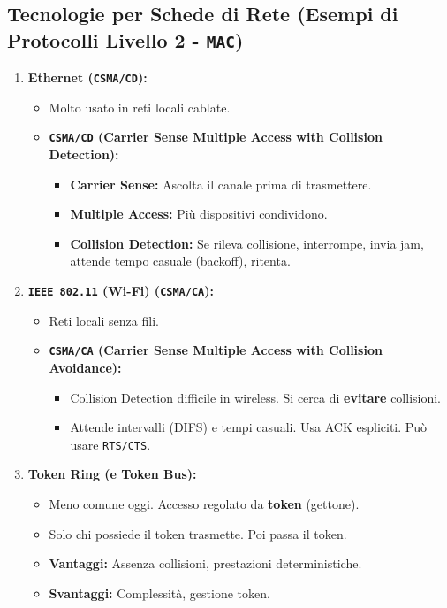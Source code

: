 \documentclass{article}
\begin{document}
\subsection{Tecnologie per Schede di Rete (Esempi di Protocolli Livello 2 - \texttt{MAC})}
\begin{enumerate}
    \item \textbf{Ethernet (\texttt{CSMA/CD}):}
    \begin{itemize}
        \item Molto usato in reti locali cablate.
        \item \textbf{\texttt{CSMA/CD} (Carrier Sense Multiple Access with Collision Detection):}
        \begin{itemize}
            \item \textbf{Carrier Sense:} Ascolta il canale prima di trasmettere.
            \item \textbf{Multiple Access:} Più dispositivi condividono.
            \item \textbf{Collision Detection:} Se rileva collisione, interrompe, invia jam, attende tempo casuale (backoff), ritenta.
        \end{itemize}
    \end{itemize}
    \item \textbf{\texttt{IEEE 802.11} (Wi-Fi) (\texttt{CSMA/CA}):}
    \begin{itemize}
        \item Reti locali senza fili.
        \item \textbf{\texttt{CSMA/CA} (Carrier Sense Multiple Access with Collision Avoidance):}
        \begin{itemize}
            \item Collision Detection difficile in wireless. Si cerca di \textbf{evitare} collisioni.
            \item Attende intervalli (DIFS) e tempi casuali. Usa ACK espliciti. Può usare \texttt{RTS/CTS}.
        \end{itemize}
    \end{itemize}
    \item \textbf{Token Ring (e Token Bus):}
    \begin{itemize}
        \item Meno comune oggi. Accesso regolato da \textbf{token} (gettone).
        \item Solo chi possiede il token trasmette. Poi passa il token.
        \item \textbf{Vantaggi:} Assenza collisioni, prestazioni deterministiche.
        \item \textbf{Svantaggi:} Complessità, gestione token.
    \end{itemize}
\end{enumerate}
\end{document}
